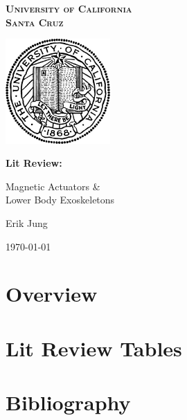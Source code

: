 \documentclass[12pt,a4paper]{article}
\begin{document}
\begin{titlepage}
	\centering
	{\scshape\huge \textbf{University of California \\ Santa Cruz} \par}
	\vspace{1cm}
	\includegraphics[width=0.3\textwidth]{pictures/uc_seal.jpg}\par\vspace{2cm}
	\vfill
	\vspace{-2cm}
	{\huge \textbf{Lit Review:}\par}
	{\huge Magnetic Actuators \& \\Lower Body Exoskeletons\par}
	\par
	\vfill

	{\large Erik Jung\par}
	{\large \today\par}
\end{titlepage}

\tableofcontents
\newpage

\setcounter{section}{0}
\captionsetup{labelfont=bf}

\section{Overview}

\newpage
\section{Lit Review Tables}


\newpage
\section{Bibliography}


\end{document}
